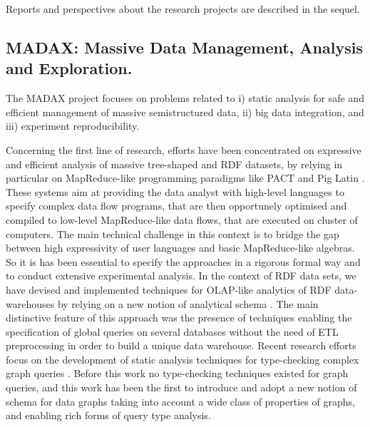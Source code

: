 \medskip
Reports and perspectives about the research projects are described  in the sequel. 


\subsection{MADAX: Massive Data Management, Analysis and Exploration.}

The MADAX project focuses on problems related to i) static analysis for safe and efficient management of massive semistructured data, ii) big data integration, and iii) experiment reproducibility. 

Concerning the first line of research, efforts have been concentrated on expressive and efficient analysis of massive tree-shaped and  RDF  datasets, by relying in particular on MapReduce-like programming paradigms like PACT and Pig Latin \cite{DBLP:conf/cikm/Camacho-Rodriguez16, DBLP:journals/tkde/Camacho-Rodriguez15, DBLP:conf/sigmod/Camacho-RodriguezCM14}. These systems aim at providing  the data analyst with high-level languages to specify complex data flow programs, that are then opportunely optimised  and compiled to low-level MapReduce-like data flows, that are executed on cluster of computers. The main technical challenge in this context is  to bridge the gap between high expressivity of user languages and basic MapReduce-like algebras. So it is has been essential to specify the approaches in a rigorous formal way and to conduct extensive experimental analysis.      In the context of RDF data sets, we have devised and implemented techniques for OLAP-like analytics of RDF data-warehouses by relying on a new notion of analytical schema \cite{Colazzo2014RDF-629026}. The main distinctive feature of this approach was the presence of techniques enabling the specification of global queries on several databases without the need of ETL preprocessing in order to build a unique data warehouse.  Recent research efforts focus on the development of static analysis techniques for type-checking complex graph queries \cite{DBLP:conf/dbpl/ColazzoS15}. Before this work no type-checking techniques existed for graph queries, and this work has been the first to introduce and adopt  a new notion of schema for data graphs taking into account a wide class of properties of graphs, and enabling rich forms of query type analysis. 


